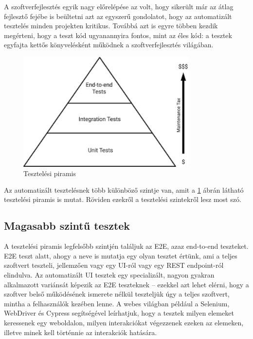 A szoftverfejlesztés egyik nagy előrelépése az volt, hogy sikerült már az átlag fejlesztő fejébe is beültetni azt az egyszerű gondolatot, hogy az automatizált tesztelés minden projekten kritikus. Továbbá azt is egyre többen kezdik megérteni, hogy a teszt kód ugyanannyira fontos, mint az éles kód: a tesztek egyfajta kettős könyvelésként működnek a szoftverfejlesztés világában.

\begin{figure}[H]
    \centering
    \includegraphics[width=0.8\textwidth]{images/piramis.png}
    \caption{Tesztelési piramis}
    \label{fig:testing-pyramid}
\end{figure}

Az automatizált tesztelésnek több különböző szintje van, amit a \ref{fig:testing-pyramid} ábrán látható tesztelési piramis is mutat. Röviden ezekről a tesztelési szintekről lesz most szó.

\subsection{Magasabb szintű tesztek}

A tesztelési piramis legfelsőbb szintjén találjuk az E2E, azaz end-to-end teszteket. E2E teszt alatt, ahogy a neve is mutatja egy olyan tesztet értünk, ami a teljes szoftvert teszteli, jellemzően vagy egy UI-ról vagy egy REST endpoint-ról elindulva. Az automatizált UI tesztek egy specializált, nagyon gyakran alkalmazott variánsát képezik az E2E teszteknek -- ezekkel azt lehet elérni, hogy a szoftver belső működésének ismerete nélkül teszteljük úgy a teljes szoftvert, mintha a felhasználók kezében lenne.
A webes világban például a Selenium, WebDriver és Cypress segítségével leírhatjuk, hogy a tesztek milyen elemeket keressenek egy weboldalon, milyen interakciókat végezzenek ezeken az elemeken, illetve minek kell történnie az interakciók hatására.

